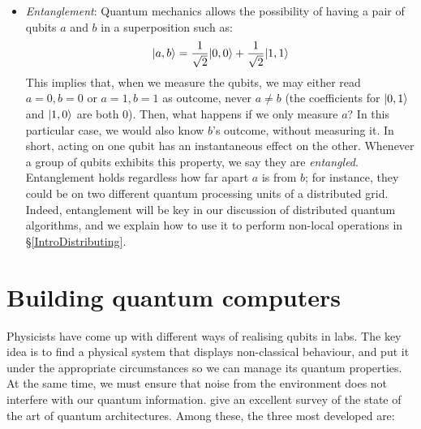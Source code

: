 \begin{itemize}
\item \textit{Entanglement}: Quantum mechanics allows the possibility of having a pair of qubits \(a\) and \(b\) in a superposition such as: \[\vert a,b \rangle = \frac{1}{\sqrt{2}}\vert 0,0 \rangle + \frac{1}{\sqrt{2}}\vert 1,1 \rangle\] This implies that, when we measure the qubits, we may either read \(a=0, b=0\) or \(a=1, b=1\) as outcome, never \(a\not=b\) (the coefficients for \(\vert 0,1 \rangle\) and \(\vert 1,0 \rangle\) are both \(0\)). Then, what happens if we only measure \(a\)? In this particular case, we would also know \(b\)'s outcome, without measuring it. In short, acting on one qubit has an instantaneous effect on the other. Whenever a group of qubits exhibits this property, we say they are \textit{entangled}. Entanglement holds regardless how far apart \(a\) is from \(b\); for instance, they could be on two different quantum processing units of a distributed grid. Indeed, entanglement will be key in our discussion of distributed quantum algorithms, and we explain how to use it to perform non-local operations in \S\ref{IntroDistributing}.

\end{itemize}


\section{Building quantum computers}
\label{Hardware}

Physicists have come up with different ways of realising qubits in labs. The key idea is to find a physical system that displays non-classical behaviour, and put it under the appropriate circumstances so we can manage its quantum properties. At the same time, we must ensure that noise from the environment does not interfere with our quantum information. \citet{ArchitectureSurvey} give an excellent survey of the state of the art of quantum architectures. Among these, the three most developed are:

